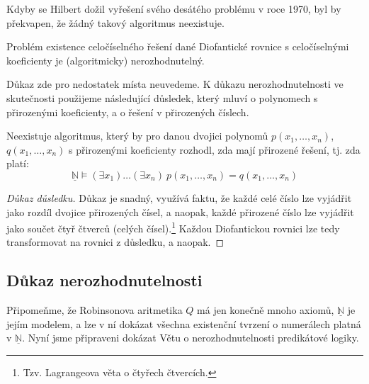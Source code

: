 Kdyby se Hilbert dožil vyřešení svého desátého problému v roce 1970, byl by překvapen, že žádný takový algoritmus neexistuje.

\begin{theorem}
Problém existence celočíselného řešení dané Diofantické rovnice s celočíselnými koeficienty je (algoritmicky) nerozhodnutelný.
\end{theorem}

Důkaz zde pro nedostatek místa neuvedeme. K důkazu nerozhodnutelnosti ve skutečnosti použijeme následující důsledek, který mluví o polynomech s přirozenými koeficienty, a o řešení v přirozených číslech. 

\begin{corollary}
Neexistuje algoritmus, který by pro danou dvojici polynomů $p(x_1,\dots,x_n)$, $q(x_1,\dots,x_n)$ s \alert{přirozenými} koeficienty rozhodl, zda mají přirozené řešení, tj. zda platí:
$$
\underline{\mathbb N}\models(\exists x_1)\dots(\exists x_n)\ p(x_1,\dots,x_n)=q(x_1,\dots,x_n)
$$
\end{corollary}
\begin{proof}[Důkaz důsledku]
Důkaz je snadný, využívá faktu, že každé celé číslo lze vyjádřit jako rozdíl dvojice přirozených čísel, a naopak, každé přirozené číslo lze vyjádřit jako součet čtyř čtverců (celých čísel).\footnote{Tzv. Lagrangeova věta o čtyřech čtvercích.} Každou Diofantickou rovnici lze tedy transformovat na rovnici z důsledku, a naopak.
\end{proof}




\subsection{Důkaz nerozhodnutelnosti}

Připomeňme, že Robinsonova aritmetika $Q$ má jen konečně mnoho axiomů, $\underline{\mathbb N}$ je jejím modelem, a lze v ní dokázat všechna \alert{existenční tvrzení o numerálech} platná v $\underline{\mathbb N}$. Nyní jsme připraveni dokázat Větu o nerozhodnutelnosti predikátové logiky.

